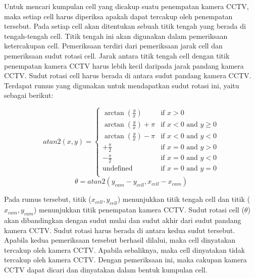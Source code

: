 Untuk mencari kumpulan cell yang dicakup suatu penempatan kamera CCTV, maka setiap cell harus diperiksa apakah dapat tercakup oleh penempatan tersebut. Pada setiap cell akan ditentukan sebuah titik tengah yang berada di tengah-tengah cell. Titik tengah ini akan digunakan dalam pemeriksaan ketercakupan cell. Pemeriksaan terdiri dari pemeriksaan jarak cell dan pemeriksaan sudut rotasi cell. Jarak antara titik tengah cell dengan titik penempatan kamera CCTV harus lebih kecil daripada jarak pandang kamera CCTV. Sudut rotasi cell harus berada di antara sudut pandang kamera CCTV. Terdapat rumus yang digunakan untuk mendapatkan sudut rotasi ini, yaitu sebagai berikut:

\begin{equation*}
	atan2(x,y) =
	\left \{
  		\begin{array}{ll}
  			\arctan(\frac{y}{x}) & \text{if } x>0\\
  			\arctan(\frac{y}{x})+\pi & \text{if } x<0 \text{ and } y\geq0\\
			\arctan(\frac{y}{x})-\pi & \text{if } x<0 \text{ and } y<0\\
			+\frac{\pi}{2} & \text{if } x=0 \text{ and } y>0\\
			-\frac{\pi}{2} & \text{if } x=0 \text{ and } y<0\\
			\text{undefined} & \text{if } x=0 \text{ and } y=0\\
  		\end{array}
  	\right.
\end{equation*}
\begin{equation*}
	\theta = atan2(y_{cam} - y_{cell}, x_{cell} - x_{cam})
\end{equation*}

Pada rumus tersebut, titik (\(x_{cell},y_{cell}\)) menunjukkan titik tengah cell dan titik (\(x_{cam},y_{cam}\)) menunjukkan titik penempatan kamera CCTV. Sudut rotasi cell (\(\theta\)) akan dibandingkan dengan sudut mulai dan sudut akhir dari sudut pandang kamera CCTV. Sudut rotasi harus berada di antara kedua sudut tersebut. Apabila kedua pemeriksaan tersebut berhasil dilalui, maka cell dinyatakan tercakup oleh kamera CCTV. Apabila sebaliknya, maka cell dinyatakan tidak tercakup oleh kamera CCTV. Dengan pemeriksaan ini, maka cakupan kamera CCTV dapat dicari dan dinyatakan dalam bentuk kumpulan cell.



